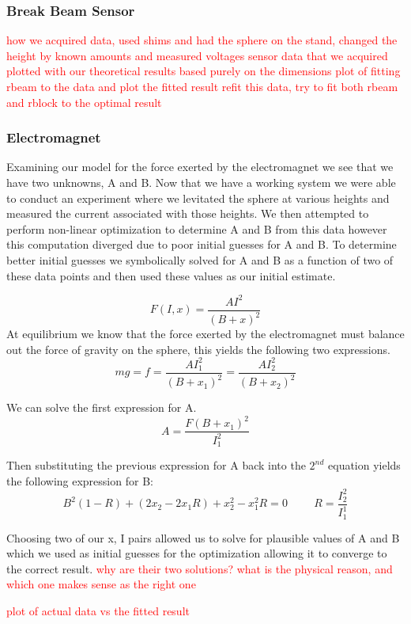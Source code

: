 \documentclass{article}
\newcommand{\xxx}[1]{\textcolor{red}{#1}}
\theoremstyle{plain}
\theoremstyle{definition}
\theoremstyle{remark}
\begin{document}
\subsubsection{Break Beam Sensor}
\xxx{how we acquired data, used shims and had the sphere on the stand, changed the height by known amounts and measured voltages}
\xxx{sensor data that we acquired plotted with our theoretical results based purely on the dimensions}
\xxx{plot of fitting rbeam to the data and plot the fitted result}
\xxx{refit this data, try to fit both rbeam and rblock to the optimal result}


\subsubsection{Electromagnet}
Examining our model for the force exerted by the electromagnet we see that we have two unknowns, A and B.  Now that we have a working system we were able to conduct an experiment where we levitated the sphere at various heights and measured the current associated with those heights.  We then attempted to perform non-linear optimization to determine A and B from this data however this computation diverged due to poor initial guesses for A and B.  To determine better initial guesses we symbolically solved for A and B as a function of two of these data points and then used these values as our initial estimate.  

$$ F(I,x) = \frac{A I^2}{(B+x)^2} $$
At equilibrium we know that the force exerted by the electromagnet must balance out the force of gravity on the sphere, this yields the following two expressions.
$$ mg = f = \frac{A I_{1}^2}{(B+x_{1})^2}  = \frac{A I_{2}^2}{(B+x_{2})^2} $$ 

We can solve the first expression for A.
$$ A = \frac{F (B + x_{1})^2}{I_{1}^2}$$

Then substituting the previous expression for A back into the $2^{nd}$ equation yields the following expression for B:
$$ B^2(1-R) + (2x_2-2x_1R)+x_2^2-x_1^2R = 0 \hspace{1cm} R = \frac{I_2^2}{I_1^1} $$

Choosing two of our x, I pairs allowed us to solve for plausible values of A and B which we used as initial guesses for the optimization allowing it to converge to the correct result.
\xxx{why are their two solutions? what is the physical reason, and which one makes sense as the right one}

\xxx{plot of actual data vs the fitted result}
\end{document}
